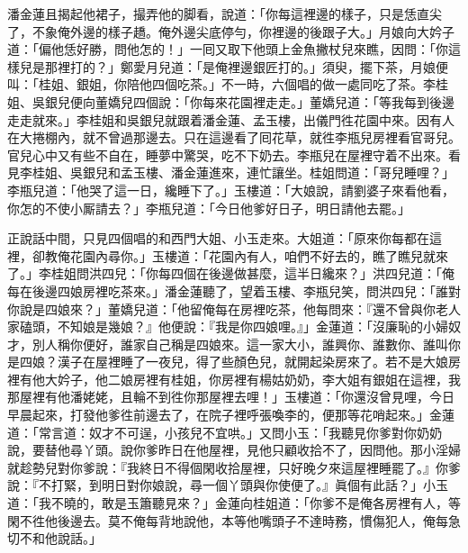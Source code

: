 潘金蓮且揭起他裙子，撮弄他的脚看，說道：「你每這裡邊的樣子，只是恁直尖了，不象俺外邊的樣子趫。俺外邊尖底停勻，你裡邊的後跟子大。」{}月娘向大妗子道：「偏他恁好勝，問他怎的！」一囘又取下他頭上金魚撇杖兒來瞧，因問：「你這樣兒是那裡打的？」鄭愛月兒道：「是俺裡邊銀匠打的。」須臾，擺下茶，月娘便叫：「桂姐、銀姐，你陪他四個吃茶。」不一時，六個唱的做一處同吃了茶。李桂姐、吳銀兒便向董嬌兒四個說：「你每來花園裡走走。」董嬌兒道：「等我每到後邊走走就來。」{}李桂姐和吳銀兒就跟着潘金蓮、孟玉樓，出儀門徃花園中來。因有人在大捲棚內，就不曾過那邊去。只在這邊看了囘花草，就徃李瓶兒房裡看官哥兒。官兒心中又有些不自在，睡夢中驚哭，吃不下奶去。李瓶兒在屋裡守着不出來。看見李桂姐、吳銀兒和孟玉樓、潘金蓮進來，連忙讓坐。桂姐問道：「哥兒睡哩？」李瓶兒道：「他哭了這一日，纔睡下了。」玉樓道：「大娘說，請劉婆子來看他看，你怎的不使小厮請去？」李瓶兒道：「今日他爹好日子，明日請他去罷。」

正說話中間，只見四個唱的和西門大姐、小玉走來。大姐道：「原來你每都在這裡，卻教俺花園內尋你。」玉樓道：「花園內有人，咱們不好去的，瞧了瞧兒就來了。」李桂姐問洪四兒：「你每四個在後邊做甚麼，這半日纔來？」洪四兒道：「俺每在後邊四娘房裡吃茶來。」潘金蓮聽了，望着玉樓、李瓶兒笑，問洪四兒：「誰對你說是四娘來？」董嬌兒道：「他留俺每在房裡吃茶，他每問來：『還不曾與你老人家磕頭，不知娘是幾娘？』他便說：『我是你四娘哩。』」金蓮道：「沒廉恥的小婦奴才，別人稱你便好，誰家自己稱是四娘來。這一家大小，誰興你、誰數你、誰叫你是四娘？漢子在屋裡睡了一夜兒，得了些顏色兒，就開起染房來了。若不是大娘房裡有他大妗子，他二娘房裡有桂姐，你房裡有楊姑奶奶，李大姐有銀姐在這裡，我那屋裡有他潘姥姥，且輪不到徃你那屋裡去哩！」{}{}玉樓道：「你還沒曾見哩，今日早晨起來，打發他爹徃前邊去了，在院子裡呼張喚李的，便那等花哨起來。」金蓮道：「常言道：奴才不可逞，小孩兒不宜哄。」{}又問小玉：「我聽見你爹對你奶奶說，要替他尋丫頭。說你爹昨日在他屋裡，見他只顧收拾不了，因問他。那小淫婦就趁勢兒對你爹說：『我終日不得個閑收拾屋裡，只好晚夕來這屋裡睡罷了。』你爹說：『不打緊，到明日對你娘說，尋一個丫頭與你使便了。』眞個有此話？」{}小玉道：「我不曉的，敢是玉簫聽見來？」金蓮向桂姐道：「你爹不是俺各房裡有人，等閑不徃他後邊去。莫不俺每背地說他，本等他嘴頭子不達時務，慣傷犯人，俺每急切不和他說話。」{}

